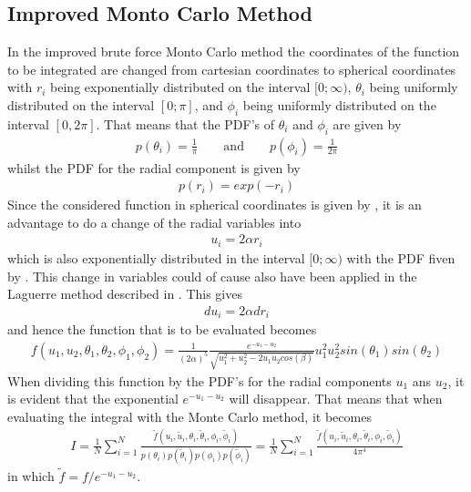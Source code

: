 \subsection{Improved Monto Carlo Method}
\label{subsec:ImprovedMCMethod}
In the improved brute force Monto Carlo method the coordinates of the function to be integrated are changed from cartesian coordinates to spherical coordinates with $r_i$ being exponentially distributed on the interval $[0;\infty)$, $\theta_i$ being uniformly distributed on the interval $[0;\pi]$, and $\phi_i$ being uniformly distributed on the interval $[0,2\pi]$. 
That means that the PDF's of $\theta_i$ and $\phi_i$ are given by
\begin{align}
	p(\theta_i ) = \frac{1}{\pi} \qquad \text{and} \qquad p(\phi_i) = \frac{1}{2\pi}
	\label{sec:ImprovedMCMethod1}
\end{align} 
whilst the PDF for the radial component is given by
\begin{align}
	p(r_i) = exp(-r_i )
	\label{sec:ImprovedMCMethod2}
\end{align}
Since the considered function in spherical coordinates is given by ,
it is an advantage to do a change of the radial variables into
\begin{align}
	u_i = 2\alpha r_i
\end{align}  
which is also exponentially distributed in the interval $[0;\infty)$ with the PDF fiven by .
This change in variables could of cause also have been applied in the Laguerre method described in .
This gives
\begin{align}
	du_i = 2\alpha dr_i
\end{align}
and hence the function that is to be evaluated becomes
\begin{align}  
   f(u_1, u_2, \theta_1, \theta_2, \phi_1, \phi_2 ) = 
   \frac{1}{(2\alpha)^5}
   \frac{e^{-u_1 - u_2 }}{\sqrt{u_1^2 + u_2 ^2 -2 u_1 u_2 cos(\beta)}}  
u_1 ^2 u_2 ^2 sin(\theta_1 ) sin(\theta_2 )    
   \label{eq:ImprovedMCMethod4}
\end{align}
When dividing this function by the PDF's for the radial components $u_1$ ans $u_2$, it is evident that the exponential $e^{-u_1 - u_2 }$ will disappear.
That means that when evaluating the integral with the Monte Carlo method, it becomes
\begin{align}
	I = \frac{1}{N} \sum_{i=1} ^N \frac{\tilde{f} (u_i, \tilde{u}_i, \theta_i, \tilde{\theta}_i, \phi_i, \tilde{\phi}_i )}{p(\theta_i)p(\tilde{\theta}_i) p(\phi_i) p(\tilde{\phi}_i)} 
	= \frac{1}{N} \sum_{i=1} ^N \frac{\tilde{f} (u_i, \tilde{u}_i, \theta_i, \tilde{\theta}_i, \phi_i, \tilde{\phi}_i )}{4\pi ^4}
\end{align}
in which $\tilde{f} = f/e^{-u_1 - u_2 }$.

